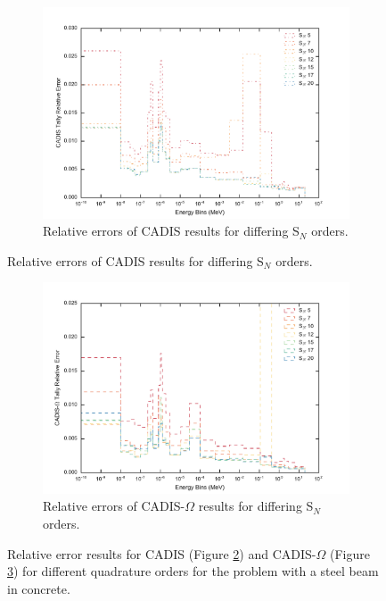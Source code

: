 \begin{figure}[htb!]
  \centering
  \begin{subfigure}[t]{\textwidth}
    \centering
    \includegraphics[width=\linewidth]{./chapters/characterization_probs/figures/angle/prob_1/err_quad_cadis.pdf}
    \caption{Relative errors of CADIS results for differing S$_N$ orders.}
    \label{fig:sn_cad_err}
  \end{subfigure}
\end{figure}
\begin{figure}[htb!]\ContinuedFloat
  \centering
  \begin{subfigure}[t]{\textwidth}
    \centering
    \includegraphics[width=\linewidth]{./chapters/characterization_probs/figures/angle/prob_1/err_quad_cadisangle.pdf}
    \caption{Relative errors of CADIS-$\Omega$ results for differing S$_N$
    orders.}
    \label{fig:sn_cadangle_err}
  \end{subfigure}
  \caption[Relative error results for CADIS and CADIS-$\Omega$ for different
  quadrature orders for the problem with a steel beam in concrete.]
  {Relative error results for CADIS (Figure \ref{fig:sn_cad_err})
  and CADIS-$\Omega$ (Figure \ref{fig:sn_cadangle_err}) for different
  quadrature orders for the problem with a steel beam in concrete.}
  \label{fig:sn_errs}
\end{figure}

